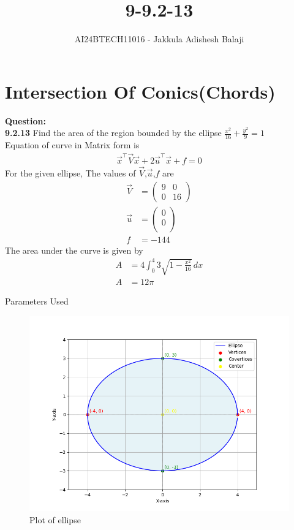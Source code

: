 \documentclass[journal]{IEEEtran}
\begin{document}

\setlength{\intextsep}{10pt} %

\title{9-9.2-13}
\author{AI24BTECH11016 - Jakkula Adishesh Balaji}
\maketitle
\section*{\textbf{Intersection Of Conics(Chords)}}
\parindent 0pt
\textbf{Question:} \\
\textbf{9.2.13} Find the area of the region bounded by the ellipse $\frac{x^{2}}{16} + \frac{y^{2}}{9} = 1$\\
\solution
Equation of curve in Matrix form is \\
\begin{align}
\vec{x}^\top\vec{V}\vec{x} + 2\vec{u}^\top\vec{x} + f = 0
\end{align}
For the given ellipse, The values of $\vec{V}$,$\vec{u}$,$f$ are
\begin{align}
\vec{V}&=\begin{pmatrix}9 & 0\\0 & 16\end{pmatrix}\\
\vec{u}&=\begin{pmatrix}0\\0\\\end{pmatrix} \\
f&=-144
\end{align}
The area under the curve is given by \\
\begin{align}
A &= 4 \int_0^4 3 \sqrt{1 - \frac{x^2}{16}} \, dx \\
A &= 12\pi 
\end{align}
\begin{table}[h!]    	
    \centering
     
    \caption{Parameters Used}
    \label{tab:1-1.9-6}
\end{table}
\begin{figure}[h!]
    \centering
    \includegraphics[width = 1\columnwidth]{figs/Figure_1.png}
    \caption{Plot of ellipse}
    \label{fig:stemplot}
\end{figure}
\end{document}
